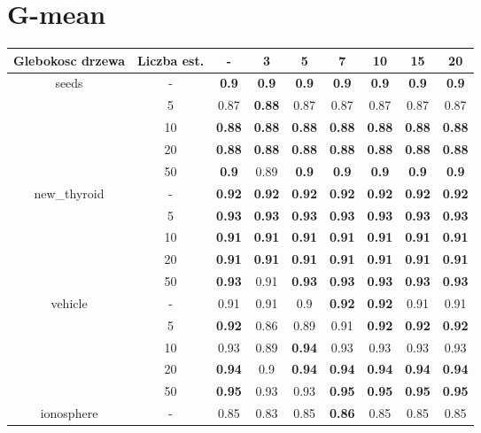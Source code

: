 \documentclass{article}%
\begin{document}
\section*{G{-}mean}%
\begin{tabular}{c|c|ccccccc}%
\hline%
Glebokosc drzewa&Liczba est.&{-}&3&5&7&10&15&20\\%
\hline%
\multirow{5}{*}{seeds}&{-}&\textbf{0.9}&\textbf{0.9}&\textbf{0.9}&\textbf{0.9}&\textbf{0.9}&\textbf{0.9}&\textbf{0.9}\\%
\cline{2%
-%
9}%
&5&0.87&\textbf{0.88}&0.87&0.87&0.87&0.87&0.87\\%
\cline{2%
-%
9}%
&10&\textbf{0.88}&\textbf{0.88}&\textbf{0.88}&\textbf{0.88}&\textbf{0.88}&\textbf{0.88}&\textbf{0.88}\\%
\cline{2%
-%
9}%
&20&\textbf{0.88}&\textbf{0.88}&\textbf{0.88}&\textbf{0.88}&\textbf{0.88}&\textbf{0.88}&\textbf{0.88}\\%
\cline{2%
-%
9}%
&50&\textbf{0.9}&0.89&\textbf{0.9}&\textbf{0.9}&\textbf{0.9}&\textbf{0.9}&\textbf{0.9}\\%
\hline%
\multirow{5}{*}{new\_thyroid}&{-}&\textbf{0.92}&\textbf{0.92}&\textbf{0.92}&\textbf{0.92}&\textbf{0.92}&\textbf{0.92}&\textbf{0.92}\\%
\cline{2%
-%
9}%
&5&\textbf{0.93}&\textbf{0.93}&\textbf{0.93}&\textbf{0.93}&\textbf{0.93}&\textbf{0.93}&\textbf{0.93}\\%
\cline{2%
-%
9}%
&10&\textbf{0.91}&\textbf{0.91}&\textbf{0.91}&\textbf{0.91}&\textbf{0.91}&\textbf{0.91}&\textbf{0.91}\\%
\cline{2%
-%
9}%
&20&\textbf{0.91}&\textbf{0.91}&\textbf{0.91}&\textbf{0.91}&\textbf{0.91}&\textbf{0.91}&\textbf{0.91}\\%
\cline{2%
-%
9}%
&50&\textbf{0.93}&0.91&\textbf{0.93}&\textbf{0.93}&\textbf{0.93}&\textbf{0.93}&\textbf{0.93}\\%
\hline%
\multirow{5}{*}{vehicle}&{-}&0.91&0.91&0.9&\textbf{0.92}&\textbf{0.92}&0.91&0.91\\%
\cline{2%
-%
9}%
&5&\textbf{0.92}&0.86&0.89&0.91&\textbf{0.92}&\textbf{0.92}&\textbf{0.92}\\%
\cline{2%
-%
9}%
&10&0.93&0.89&\textbf{0.94}&0.93&0.93&0.93&0.93\\%
\cline{2%
-%
9}%
&20&\textbf{0.94}&0.9&\textbf{0.94}&\textbf{0.94}&\textbf{0.94}&\textbf{0.94}&\textbf{0.94}\\%
\cline{2%
-%
9}%
&50&\textbf{0.95}&0.93&0.93&\textbf{0.95}&\textbf{0.95}&\textbf{0.95}&\textbf{0.95}\\%
\hline%
\multirow{5}{*}{ionosphere}&{-}&0.85&0.83&0.85&\textbf{0.86}&0.85&0.85&0.85\\%

\end{tabular}
\end{document}

